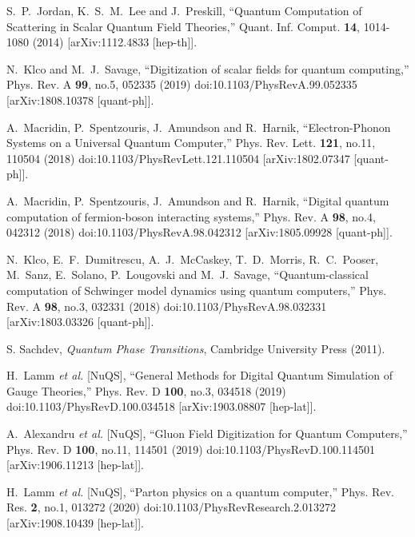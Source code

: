 \documentclass[a4paper,11pt]{article}
\begin{document}
\begin{thebibliography}{99}
S.~P.~Jordan, K.~S.~M.~Lee and J.~Preskill,
``Quantum Computation of Scattering in Scalar Quantum Field Theories,''
Quant. Inf. Comput. \textbf{14}, 1014-1080 (2014)
[arXiv:1112.4833 [hep-th]].

N.~Klco and M.~J.~Savage,
``Digitization of scalar fields for quantum computing,''
Phys. Rev. A \textbf{99}, no.5, 052335 (2019)
doi:10.1103/PhysRevA.99.052335
[arXiv:1808.10378 [quant-ph]].

A.~Macridin, P.~Spentzouris, J.~Amundson and R.~Harnik,
``Electron-Phonon Systems on a Universal Quantum Computer,''
Phys. Rev. Lett. \textbf{121}, no.11, 110504 (2018)
doi:10.1103/PhysRevLett.121.110504
[arXiv:1802.07347 [quant-ph]].

A.~Macridin, P.~Spentzouris, J.~Amundson and R.~Harnik,
``Digital quantum computation of fermion-boson interacting systems,''
Phys. Rev. A \textbf{98}, no.4, 042312 (2018)
doi:10.1103/PhysRevA.98.042312
[arXiv:1805.09928 [quant-ph]].

N.~Klco, E.~F.~Dumitrescu, A.~J.~McCaskey, T.~D.~Morris, R.~C.~Pooser, M.~Sanz, E.~Solano, P.~Lougovski and M.~J.~Savage,
``Quantum-classical computation of Schwinger model dynamics using quantum computers,''
Phys. Rev. A \textbf{98}, no.3, 032331 (2018)
doi:10.1103/PhysRevA.98.032331
[arXiv:1803.03326 [quant-ph]].

S. Sachdev,
{\it Quantum Phase Transitions},
Cambridge University Press (2011).

H.~Lamm \textit{et al.} [NuQS],
``General Methods for Digital Quantum Simulation of Gauge Theories,''
Phys. Rev. D \textbf{100}, no.3, 034518 (2019)
doi:10.1103/PhysRevD.100.034518
[arXiv:1903.08807 [hep-lat]].

A.~Alexandru \textit{et al.} [NuQS],
``Gluon Field Digitization for Quantum Computers,''
Phys. Rev. D \textbf{100}, no.11, 114501 (2019)
doi:10.1103/PhysRevD.100.114501
[arXiv:1906.11213 [hep-lat]].

H.~Lamm \textit{et al.} [NuQS],
``Parton physics on a quantum computer,''
Phys. Rev. Res. \textbf{2}, no.1, 013272 (2020)
doi:10.1103/PhysRevResearch.2.013272
[arXiv:1908.10439 [hep-lat]].


\end{thebibliography}
\end{document}
